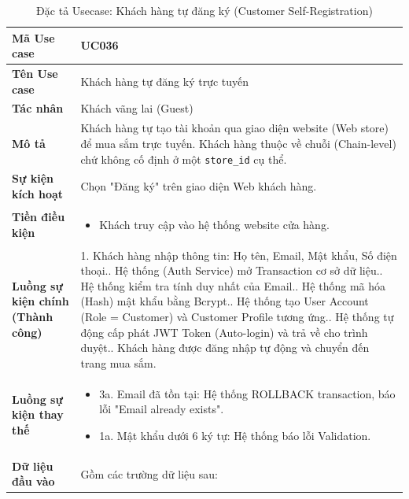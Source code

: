 \documentclass[12pt,a4paper]{report}
\begin{document}
\begin{longtable}{|>{\raggedright\arraybackslash\bfseries}p{4.5cm}|p{11cm}|}
\caption{Đặc tả Usecase: Khách hàng tự đăng ký (Customer Self-Registration)} \label{tab:uc_036} \\
\hline
Mã Use case & UC036 \\ \hline
Tên Use case & Khách hàng tự đăng ký trực tuyến \\ \hline
Tác nhân & Khách vãng lai (Guest) \\ \hline
Mô tả & Khách hàng tự tạo tài khoản qua giao diện website (Web store) để mua sắm trực tuyến. Khách hàng thuộc về chuỗi (Chain-level) chứ không cố định ở một \texttt{store\_id} cụ thể. \\ \hline
Sự kiện kích hoạt & Chọn "Đăng ký" trên giao diện Web khách hàng. \\ \hline
Tiền điều kiện & 
\begin{itemize}[leftmargin=*, nosep, topsep=0pt, partopsep=0pt]
    \item Khách truy cập vào hệ thống website cửa hàng.
\end{itemize} \\ \hline
Luồng sự kiện chính (Thành công) & 
1. Khách hàng nhập thông tin: Họ tên, Email, Mật khẩu, Số điện thoại.\newline
2. Hệ thống (Auth Service) mở Transaction cơ sở dữ liệu.\newline
3. Hệ thống kiểm tra tính duy nhất của Email.\newline
4. Hệ thống mã hóa (Hash) mật khẩu bằng Bcrypt.\newline
5. Hệ thống tạo User Account (Role = Customer) và Customer Profile tương ứng.\newline
6. Hệ thống tự động cấp phát JWT Token (Auto-login) và trả về cho trình duyệt.\newline
7. Khách hàng được đăng nhập tự động và chuyển đến trang mua sắm. \\ \hline
Luồng sự kiện thay thế & 
\begin{itemize}[leftmargin=*, nosep, topsep=0pt, partopsep=0pt]
    \item 3a. Email đã tồn tại: Hệ thống ROLLBACK transaction, báo lỗi "Email already exists".
    \item 1a. Mật khẩu dưới 6 ký tự: Hệ thống báo lỗi Validation.
\end{itemize} \\ \hline
Dữ liệu đầu vào & 
Gồm các trường dữ liệu sau:\newline
\vspace{0.1cm}

\end{longtable}
\end{document}
